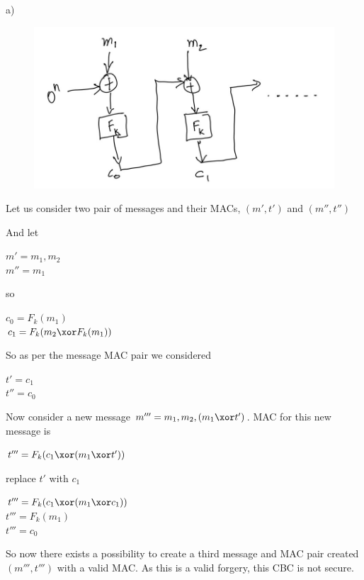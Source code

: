 a)
\begin{figure}[h]
    \includegraphics[width=\textwidth,height=\textheight,keepaspectratio]{7-3 IMG.jpg}
    \centering
\end{figure}


Let us consider two pair of messages and their MACs, $(m', t')$ and $(m'', t'')$

And let 
\begin{center}
    $m' = {m_1, m_2 }$ \\
    $m'' = {m_1}$ 
\end{center}

so

\begin{center}
    $c_0 = F_k(m_1)$\\
    $c_1 = F_k(m_2 \xor F_k(m_1))$
\end{center}

So as per the message MAC pair we considered 
\begin{center}
    $t' = c_1$\\
    $t''= c_0$
\end{center}

Now consider a new message $m''' = {m_1, m_2, (m_1 \xor t')}$. MAC for this new 
message is 
\begin{center}
    $t''' = F_k(c_1 \xor (m_1 \xor t'))$\\
\end{center}
    replace $t'$ with $c_1$\\
\begin{center}
    $t''' = F_k(c_1 \xor (m_1 \xor c_1))$ \\
    $t''' = F_k(m_1)$\\
    $t''' = c_0$
\end{center}

So now there exists a possibility to create a third message and MAC pair created
$(m''', t''')$ with a valid MAC. As this is a valid forgery, this CBC is not secure.